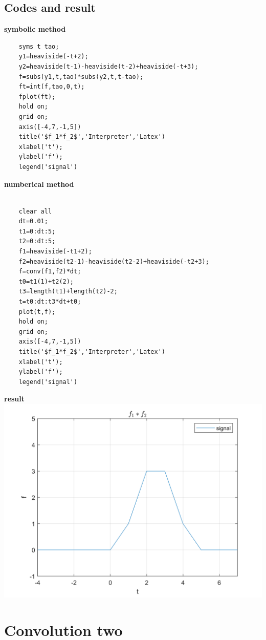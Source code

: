 \documentclass[UTF8,a4paper]{article}
\begin{document}
\subsection{Codes and result}
\textbf{symbolic method}
\begin{lstlisting}
    syms t tao;
    y1=heaviside(-t+2);
    y2=heaviside(t-1)-heaviside(t-2)+heaviside(-t+3);
    f=subs(y1,t,tao)*subs(y2,t,t-tao);
    ft=int(f,tao,0,t);
    fplot(ft);
    hold on;
    grid on;
    axis([-4,7,-1,5])
    title('$f_1*f_2$','Interpreter','Latex')
    xlabel('t');
    ylabel('f');
    legend('signal')
\end{lstlisting}
\textbf{numberical method}
\begin{lstlisting}

    clear all
    dt=0.01;
    t1=0:dt:5;
    t2=0:dt:5;
    f1=heaviside(-t1+2);
    f2=heaviside(t2-1)-heaviside(t2-2)+heaviside(-t2+3);
    f=conv(f1,f2)*dt;
    t0=t1(1)+t2(2);
    t3=length(t1)+length(t2)-2;
    t=t0:dt:t3*dt+t0;
    plot(t,f);
    hold on;
    grid on;
    axis([-4,7,-1,5])
    title('$f_1*f_2$','Interpreter','Latex')
    xlabel('t');
    ylabel('f');
    legend('signal')
\end{lstlisting}
\textbf{result}\\
\includegraphics[scale=0.8]{T1.png}
\newpage
\section{Convolution two}
\end{document}
